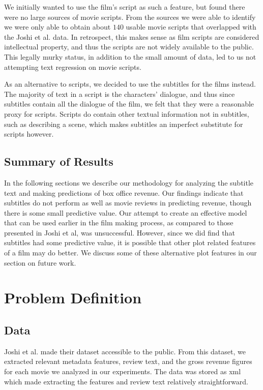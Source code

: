 \documentclass[11pt]{article}
\begin{document}
We initially wanted to use the film's script as such a feature, but found 
there were no large sources of movie scripts.
From the sources we were able to identify we were only able to
obtain about $140$ usable movie scripts that overlapped with the Joshi et al. data. 
In retrospect, this makes sense as film scripts are considered
intellectual property, and thus the scripts are not widely available to the public.
This legally murky status, in addition to the small amount of data, led to us not
attempting text regression on movie scripts.

As an alternative to scripts, we decided to use the subtitles for the films instead. The
majority of text in a script is the characters' dialogue, and thus since subtitles contain
all the dialogue of the film, we felt that they were a reasonable proxy for scripts.
Scripts do contain other textual information not in subtitles, such as describing a scene,
which makes subtitles an imperfect substitute for scripts however.

\subsection{Summary of Results}
In the following sections we describe our methodology for analyzing the subtitle text
and making predictions of box office revenue. Our findings indicate that subtitles do
not perform as well as movie reviews in predicting revenue, though there is some small
predictive value. Our attempt to create an effective model that can be used
earlier in the film making process, as compared to those presented in Joshi et al, was 
unsuccessful. However, since we did find that subtitles had some predictive value, it 
is possible that other plot related features of a film may do better. We discuss some of
these alternative plot features in our section on future work.

\section{Problem Definition}
\subsection{Data}
Joshi et al. made their dataset accessible to the public. From this dataset,
we extracted relevant metadata features, review text, and the gross revenue figures for each movie we analyzed in our experiments. The data was stored as
xml which made extracting the features and review text relatively straightforward.
\end{document}
